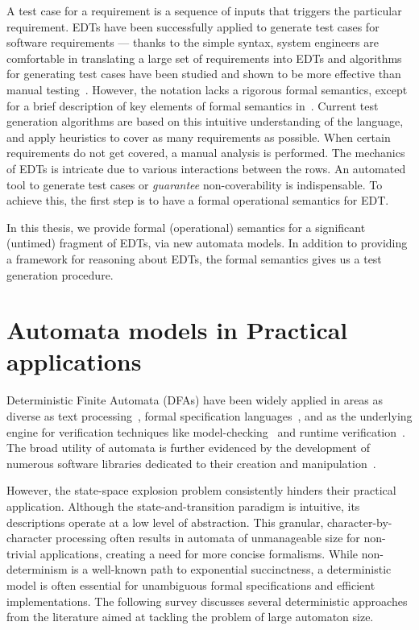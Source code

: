 A test case for a requirement is a sequence of inputs that triggers
the particular requirement. EDTs have been successfully applied to
generate test cases for software requirements --- thanks to the simple
syntax, system engineers are comfortable in translating a large set of
requirements into EDTs and algorithms for generating test cases have
been studied and shown to be more effective than manual
testing~\cite{DBLP:conf/enase/VenkateshSZA15a}. However, the notation lacks a
rigorous formal semantics, except for a brief description of key
elements of formal semantics in~\cite{DBLP:conf/date/VenkateshSKA14}. Current
test generation algorithms are based on this intuitive understanding
of the language, and apply heuristics to cover as many requirements as
possible. When certain requirements do not get covered, a manual
analysis is performed. The mechanics of
EDTs is intricate due to various interactions between the rows. An
automated tool to generate test cases or \emph{guarantee}
non-coverability is indispensable. To achieve this, the first step is
to have a formal operational semantics for EDT.

In this thesis, we provide formal (operational) semantics for a significant (untimed) fragment of
EDTs, via new automata models. In addition to providing a framework
for reasoning about EDTs, the formal semantics gives us a test generation procedure.


\section{Automata models in Practical applications}

Deterministic Finite Automata (DFAs) have been widely applied in areas as diverse as text processing~\cite{DBLP:journals/tcs/MohriMW09}, formal specification languages~\cite{DBLP:journals/scp/Harel87}, and as the underlying engine for verification techniques like model-checking~\cite{DBLP:books/daglib/0007403-2} and runtime verification~\cite{DBLP:conf/cav/BouajjaniJNT00, DBLP:conf/cav/BouajjaniHV04, 989841}. The broad utility of automata is further evidenced by the development of numerous software libraries dedicated to their creation and manipulation~\cite{Awali2.2}.

However, the state-space explosion problem consistently hinders their practical application. Although the state-and-transition paradigm is intuitive, its descriptions operate at a low level of abstraction. This granular, character-by-character processing often results in automata of unmanageable size for non-trivial applications, creating a need for more concise formalisms. While non-determinism is a well-known path to exponential succinctness, a deterministic model is often essential for unambiguous formal specifications and efficient implementations. The following survey discusses several deterministic approaches from the literature aimed at tackling the problem of large automaton size.

